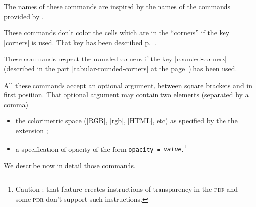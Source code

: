 \documentclass[dvipsnames]{article}%
\begin{document}

The names of these commands are inspired by the names of the commands provided
by .


\medskip
These commands don't color the cells which are in the ``corners'' if the key
|corners| is used. That key has been described p.~\pageref{corners}.

\medskip
These commands respect the rounded corners if the key |rounded-corners|
(described in the part \ref{tabular-rounded-corners} at the
page~\pageref{tabular-rounded-corners}) has been used.

\medskip
All these commands accept an optional argument, between square brackets and
in first position. That optional argument may contain two elements (separated
by a comma)
\begin{itemize}
\item the colorimetric space (|RGB|, |rgb|, |HTML|, etc) as specified by the
the extension ;
\item {}
a specification of opacity of the form \texttt{opacity =
  \textsl{value}}.\footnote{Caution : that feature creates instructions of
  transparency in the \textsc{pdf} and some \textsc{pdr} don't support such instructions.}
\end{itemize}

\bigskip

We describe now in detail those commands.
\end{document}
